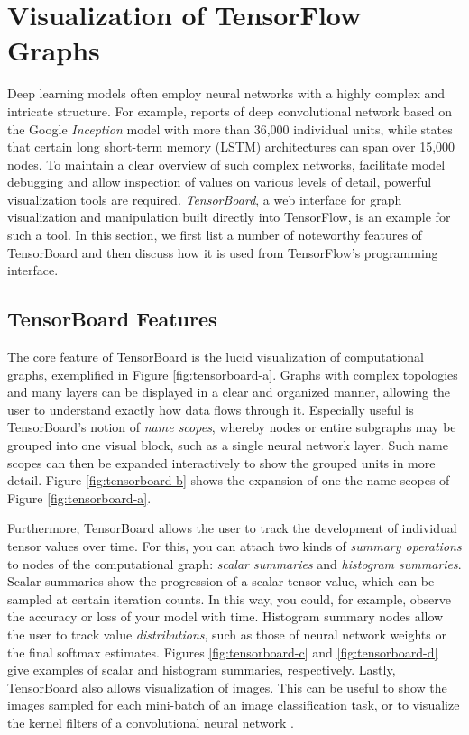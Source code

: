 \section{Visualization of TensorFlow Graphs}\label{sec:visual}

Deep learning models often employ neural networks with a highly complex and
intricate structure. For example, \cite{inception} reports of deep convolutional
network based on the Google \emph{Inception} model with more than 36,000
individual units, while \cite{tensorflow} states that certain long short-term
memory (LSTM) architectures can span over 15,000 nodes. To maintain a clear
overview of such complex networks, facilitate model debugging and allow
inspection of values on various levels of detail, powerful visualization tools
are required. \emph{TensorBoard}, a web interface for graph visualization and
manipulation built directly into TensorFlow, is an example for such a tool. In
this section, we first list a number of noteworthy features of TensorBoard and
then discuss how it is used from TensorFlow's programming interface.

\subsection{TensorBoard Features}\label{sec:visual-features}

The core feature of TensorBoard is the lucid visualization of computational
graphs, exemplified in Figure \ref{fig:tensorboard-a}. Graphs with complex
topologies and many layers can be displayed in a clear and organized manner,
allowing the user to understand exactly how data flows through it. Especially
useful is TensorBoard's notion of \emph{name scopes}, whereby nodes or entire
subgraphs may be grouped into one visual block, such as a single neural network
layer. Such name scopes can then be expanded interactively to show the grouped
units in more detail. Figure \ref{fig:tensorboard-b} shows the expansion of one
the name scopes of Figure \ref{fig:tensorboard-a}.

Furthermore, TensorBoard allows the user to track the development of individual
tensor values over time. For this, you can attach two kinds of \emph{summary
  operations} to nodes of the computational graph: \emph{scalar summaries} and
\emph{histogram summaries}. Scalar summaries show the progression of a scalar
tensor value, which can be sampled at certain iteration counts. In this way, you
could, for example, observe the accuracy or loss of your model with
time. Histogram summary nodes allow the user to track value
\emph{distributions}, such as those of neural network weights or the final
softmax estimates. Figures \ref{fig:tensorboard-c} and \ref{fig:tensorboard-d}
give examples of scalar and histogram summaries, respectively. Lastly,
TensorBoard also allows visualization of images. This can be useful to show the
images sampled for each mini-batch of an image classification task, or to
visualize the kernel filters of a convolutional neural network
\cite{tensorflow}.

